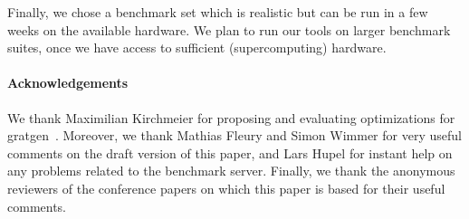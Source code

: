 \documentclass[smallcondensed]{svjour3}     %
\begin{document}
Finally, we chose a benchmark set which is realistic but can be run in a few weeks on the available hardware.
We plan to run our tools on larger benchmark suites, once we have access to sufficient (supercomputing) hardware.

\paragraph{Acknowledgements} We thank Maximilian Kirchmeier for proposing and evaluating optimizations for gratgen~\cite{Kirch17}.
Moreover, we thank Mathias Fleury and Simon Wimmer for very useful comments on the draft version of this paper, 
and Lars Hupel for instant help on any problems related to the benchmark server. Finally, we thank the anonymous reviewers of the 
conference papers on which this paper is based for their useful comments.




\end{document}
